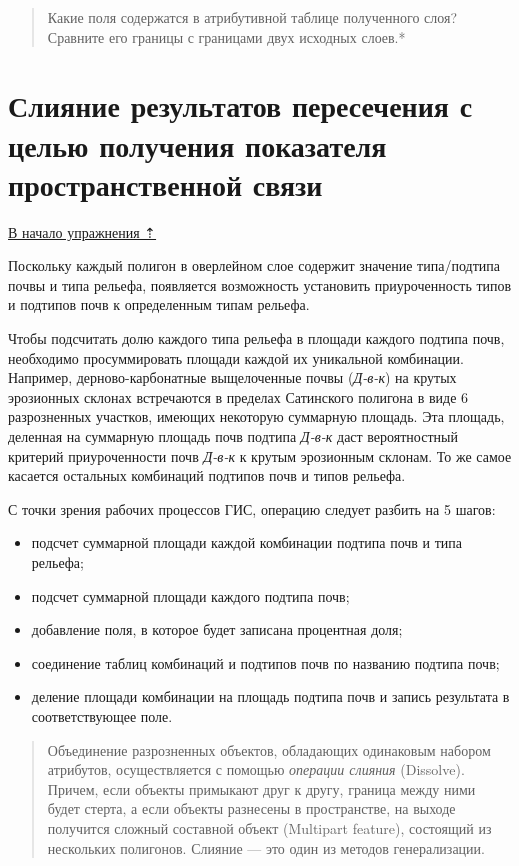\documentclass[12pt,]{book}
\begin{document}
\begin{quote}
Какие поля содержатся в атрибутивной таблице полученного слоя? Сравните его границы с границами двух исходных слоев.*
\end{quote}

\hypertarget{overlay-merge}{%
\section{Слияние результатов пересечения с целью получения показателя пространственной связи}\label{overlay-merge}}

\protect\hyperlink{overlay}{В начало упражнения ⇡}

Поскольку каждый полигон в оверлейном слое содержит значение типа/подтипа почвы и типа рельефа, появляется возможность установить приуроченность типов и подтипов почв к определенным типам рельефа.

Чтобы подсчитать долю каждого типа рельефа в площади каждого подтипа почв, необходимо просуммировать площади каждой их уникальной комбинации. Например, дерново-карбонатные выщелоченные почвы (\emph{Д-в-к}) на крутых эрозионных склонах встречаются в пределах Сатинского полигона в виде 6 разрозненных участков, имеющих некоторую суммарную площадь. Эта площадь, деленная на суммарную площадь почв подтипа \emph{Д-в-к} даст вероятностный критерий приуроченности почв \emph{Д-в-к} к крутым эрозионным склонам. То же самое касается остальных комбинаций подтипов почв и типов рельефа.

С точки зрения рабочих процессов ГИС, операцию следует разбить на 5 шагов:

\begin{itemize}
\item
  подсчет суммарной площади каждой комбинации подтипа почв и типа рельефа;
\item
  подсчет суммарной площади каждого подтипа почв;
\item
  добавление поля, в которое будет записана процентная доля;
\item
  соединение таблиц комбинаций и подтипов почв по названию подтипа почв;
\item
  деление площади комбинации на площадь подтипа почв и запись результата в соответствующее поле.
\end{itemize}

\begin{quote}
Объединение разрозненных объектов, обладающих одинаковым набором атрибутов, осуществляется с помощью \emph{операции слияния} (Dissolve). Причем, если объекты примыкают друг к другу, граница между ними будет стерта, а если объекты разнесены в пространстве, на выходе получится сложный составной объект (Multipart feature), состоящий из нескольких полигонов. Слияние --- это один из методов генерализации.
\end{quote}
\end{document}
